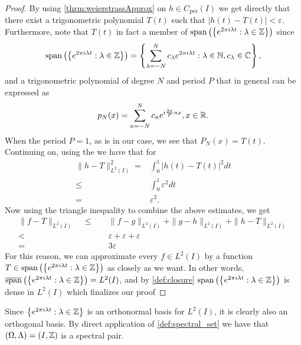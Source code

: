 \documentclass[../thesis.tex]{subfiles}
\begin{document}
\begin{proof}
    By using \cref{thrm:weierstrassApprox} on $h\in C_{\text{per}}(I)$ we get directly that there exist a trigonometric polynomial $T(t)$  such that $|h(t)-T(t)|<\varepsilon$. Furthermore, note that $T(t)$ in fact a member of $\operatorname{span}\left( \left\{e^{2\pi i \lambda t } : \lambda \in \mathbb{Z}\right\} \right)$ since 
    \begin{equation*}
        \operatorname{span}\left( \left\{e^{2\pi i \lambda t } : \lambda \in \mathbb{Z}\right\} \right)=\left\{\sum_{\lambda=-N}^N c_\lambda e^{2\pi i \lambda t} : \lambda \in \mathbb{N}, c_\lambda \in \mathbb{C}\right\},
    \end{equation*}
    and a trigonometric polynomial of degree $N$ and period $P$ that in general can be expressed as
    \begin{equation*}
        p_N(x)=\sum_{n=-N}^N c_n e^{i \frac{2 \pi}{P} n x}, x\in \mathbb{R}.
    \end{equation*}
    When the period $P=1$, as is in our case, we see that $P_N(x)= T(t)$. Continuing on, using the \Ltwonorm we have that for %
    \begin{align*}
        \| h-T \|_{L^2(I)}^2 =& \int_0^1 \left|h(t)-T(t) \right|^2dt \\ 
        \leq &\int_0^1 \varepsilon^2 dt\\ 
        =& \varepsilon^2.
    \end{align*}
    Now using the triangle inequality to combine the above estimates, we get
    \begin{align*} 
        \| f-T\|_{L^2(I)} \quad \leq&\quad  \| f-g\|_{L^2(I)} + \| g-h\|_{L^2(I)} +\| h-T\|_{L^2(I)}\\
        <& \quad \varepsilon + \varepsilon +\varepsilon \\
        =& \quad 3 \varepsilon
    \end{align*}
    For this reason, we can approximate every $f\in L^2(I)$ by a function $T \in \operatorname{span}\left( \left\{e^{2\pi i \lambda t } : \lambda \in \mathbb{Z}\right\} \right)$ as closely as we want. In other words, $\overline{\operatorname{span}}\left( \left\{e^{2\pi i \lambda t } : \lambda \in \mathbb{Z}\right\} \right)=L^2(I)$, and by \cref{def:closure} $\operatorname{span}\left( \left\{e^{2\pi i \lambda t } : \lambda \in \mathbb{Z}\right\} \right)$ is dense in $L^2(I)$ which finalizes our proof%
\end{proof}

\begin{remark}
    Since $\left\{e^{2\pi i \lambda t } : \lambda \in \mathbb{Z}\right\}$ is an orthonormal basis for $L^2(I)$, it is clearly also an orthogonal basis. By direct application of \cref{def:spectral_set} we have that $\left(\Omega, \Lambda\right)=\left(I,\mathbb{Z}\right)$ is a spectral pair.
\end{remark}
\end{document}
